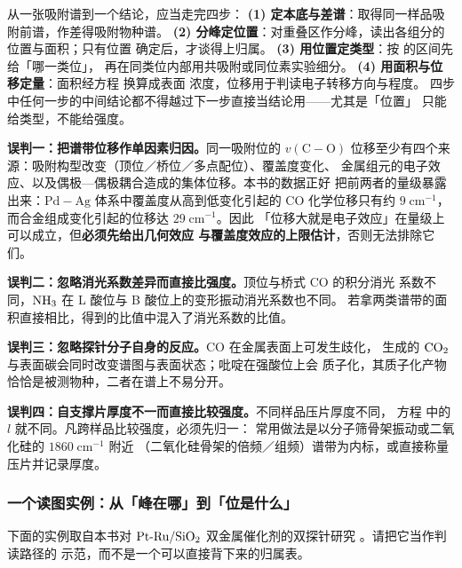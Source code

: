 \begin{dataflow}
从一张吸附谱到一个结论，应当走完四步：
\textbf{(1) 定本底与差谱}：取得同一样品吸附前谱，作差得吸附物种谱。
\textbf{(2) 分峰定位置}：对重叠区作分峰，读出各组分的位置与面积；只有位置
确定后，才谈得上归属。
\textbf{(3) 用位置定类型}：按  的区间先给「哪一类位」，
再在同类位内部用共吸附或同位素实验细分。
\textbf{(4) 用面积与位移定量}：面积经方程  换算成表面
浓度，位移用于判读电子转移方向与程度。
四步中任何一步的中间结论都不得越过下一步直接当结论用——尤其是「位置」
只能给类型，不能给强度。
\end{dataflow}

\begin{pitfall}
\textbf{误判一：把谱带位移作单因素归因。}同一吸附位的 $v(\mathrm{C{-}O})$
位移至少有四个来源：吸附构型改变（顶位／桥位／多点配位）、覆盖度变化、
金属组元的电子效应、以及偶极—偶极耦合造成的集体位移。本书的数据正好
把前两者的量级暴露出来：$\mathrm{Pd{-}Ag}$ 体系中覆盖度从高到低变化引起的
CO 化学位移只有约 $9\;\mathrm{cm^{-1}}$，而合金组成变化引起的位移达
$29\;\mathrm{cm^{-1}}$。因此
「位移大就是电子效应」在量级上可以成立，但\textbf{必须先给出几何效应
与覆盖度效应的上限估计}，否则无法排除它们。

\textbf{误判二：忽略消光系数差异而直接比强度。}顶位与桥式 CO 的积分消光
系数不同，$\ce{NH3}$ 在 L 酸位与 B 酸位上的变形振动消光系数也不同。
若拿两类谱带的面积直接相比，得到的比值中混入了消光系数的比值。

\textbf{误判三：忽略探针分子自身的反应。}CO 在金属表面上可发生歧化，
生成的 $\ce{CO2}$ 与表面碳会同时改变谱图与表面状态；吡啶在强酸位上会
质子化，其质子化产物恰恰是被测物种，二者在谱上不易分开。

\textbf{误判四：自支撑片厚度不一而直接比较强度。}不同样品压片厚度不同，
方程  中的 $l$ 就不同。凡跨样品比较强度，必须先归一：
常用做法是以分子筛骨架振动或二氧化硅的 $1860\;\mathrm{cm^{-1}}$ 附近
（二氧化硅骨架的倍频／组频）谱带为内标，或直接称量压片并记录厚度。
\end{pitfall}

\subsubsection{一个读图实例：从「峰在哪」到「位是什么」}

下面的实例取自本书对 $\ce{Pt{-}Ru/SiO2}$ 双金属催化剂的双探针研究
。请把它当作判读路径的
示范，而不是一个可以直接背下来的归属表。

